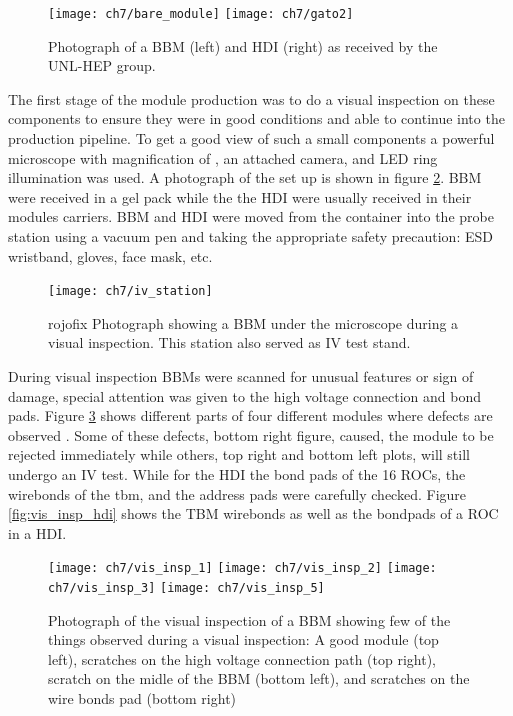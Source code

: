 \begin{figure}[!h]
\centering
\texttt{[image: ch7/bare\_module]}
\texttt{[image: ch7/gato2]}
\caption[Photograph of a BBM and HDI.]{Photograph of a BBM (left) and HDI (right) as received by the UNL-HEP group.}\label{fig:bbmyhdi}
\end{figure}

The first stage of the module production was to do a visual inspection on these components to ensure they were in good conditions and able to continue into the production pipeline. {} To get a good view of such a small components a powerful microscope with magnification of {}, an attached camera, and LED ring illumination was used. A photograph of the set up is shown in figure \ref{fig:iv_station}. BBM were received in a gel pack while the the HDI were usually received in their modules carriers. BBM and HDI were moved from the container into the probe station using a vacuum pen and taking the appropriate safety precaution: ESD wristband, gloves, face mask, etc.

\begin{figure}[!h]
\centering
\texttt{[image: ch7/iv\_station]}
\caption[Photograph of the visual inspection and IV test station.]{{rojo{fix}} Photograph showing a BBM under the microscope during a visual inspection. This station also served as IV test stand.}\label{fig:iv_station}
\end{figure}

During visual inspection BBMs were scanned for unusual features or sign of damage, special attention was given to the high voltage connection and bond pads. Figure \ref{fig:vis_insp_bbm} shows different parts of four different modules where defects are observed {}. Some of these defects, bottom right figure, caused, the module to be rejected immediately while others, top right and bottom left plots, will still undergo an IV test. While for the HDI the bond pads of the 16 ROCs, the wirebonds of the tbm, and the address pads were carefully checked. Figure \ref{fig:vis_insp_hdi} shows the TBM wirebonds as well as the bondpads of a ROC in a HDI.

\begin{figure}[!h]
  \centering
  \texttt{[image: ch7/vis\_insp\_1]}
  \texttt{[image: ch7/vis\_insp\_2]}
  \texttt{[image: ch7/vis\_insp\_3]}
  \texttt{[image: ch7/vis\_insp\_5]}
  \caption[Visual inspection of a bare module.]{Photograph of the visual inspection of a BBM showing few of the things observed during a visual inspection: A good module (top left), scratches on the high voltage connection path (top right), scratch on the midle of the BBM (bottom left), and scratches on the wire bonds pad (bottom right)}\label{fig:vis_insp_bbm}
\end{figure}

